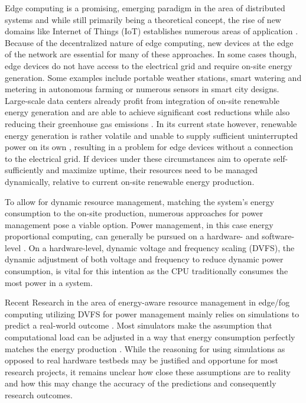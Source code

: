 Edge computing is a promising, emerging paradigm in the area of distributed
systems and while still primarily being a theoretical concept, the rise of new
domains like Internet of Things (IoT) establishes numerous areas of application
\cite{premsankar2018}. Because of the decentralized nature of edge computing,
new devices at the edge of the network are essential for many of these
approaches. In some cases though, edge devices do not have access to the
electrical grid and require on-site energy generation. Some examples include
portable weather stations, smart watering and metering in autonomous farming or
numerous sensors in smart city designs. Large-scale data centers already profit
from integration of on-site renewable energy generation and are able to achieve
significant cost reductions while also reducing their greenhouse gas emissions
\cite{tu2013}. In its current state however, renewable energy generation is
rather volatile and unable to supply sufficient uninterrupted power on its own
\cite{rostirolla2022}, resulting in a problem for edge devices without a
connection to the electrical grid. If devices under these circumstances aim to
operate self-sufficiently and maximize uptime, their resources need to be
managed dynamically, relative to current on-site renewable energy production.

To allow for dynamic resource management, matching the system's energy
consumption to the on-site production, numerous approaches for power management
pose a viable option. Power management, in this case energy proportional
computing, can generally be pursued on a hardware- and software-level
\cite{barroso2007}. On a hardware-level, dynamic voltage and frequency scaling
(DVFS), the dynamic adjustment of both voltage and frequency to reduce dynamic
power consumption, is vital for this intention as the \textsc{CPU} traditionally
consumes the most power in a system.

Recent Research in the area of energy-aware resource management in edge/fog
computing utilizing DVFS for power management mainly relies on simulations to
predict a real-world outcome \cite{wiesner2022, karimiafshar2020, toor2019}.
Most simulators make the assumption that computational load can be adjusted in a
way that energy consumption perfectly matches the energy production \cite{leaf,
cloudsim, ifogsim, chameleon}. While the reasoning for using simulations as
opposed to real hardware testbeds may be justified and opportune for most
research projects, it remains unclear how close these assumptions are to reality
and how this may change the accuracy of the predictions and consequently
research outcomes.

